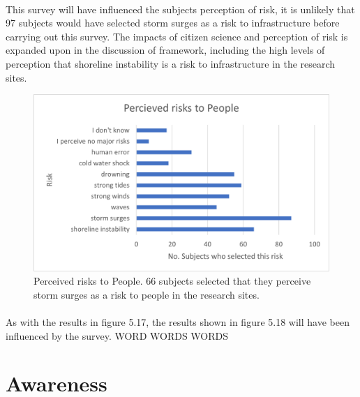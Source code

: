 \paragraph{}
This survey will have influenced the subjects perception of risk, it is unlikely that 97 subjects would have selected storm surges as a risk to infrastructure before carrying out this survey. The impacts of citizen science and perception of risk is expanded upon in the discussion of framework, including the high levels of perception that shoreline instability is a risk to infrastructure in the research sites.


\begin{figure}[h!]
    \centering
    \includegraphics{fig_results/people-risks.png}
    \caption{Perceived risks to People. 66 subjects selected that they perceive storm surges as a risk to people in the research sites. }
    \label{fig:my_label}
\end{figure}
\paragraph{}

As with the results in figure 5.17, the results shown in figure 5.18 will have been influenced by the survey. 
WORD WORDS WORDS 

\section{Awareness}


